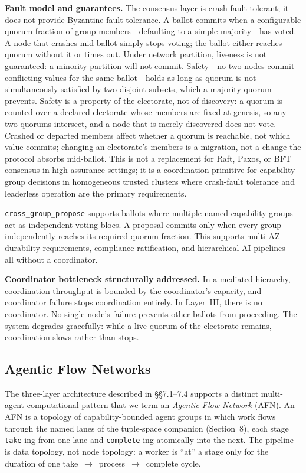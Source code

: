 \documentclass[11pt]{article}
\begin{document}
\textbf{Fault model and guarantees.} The consensus layer is crash-fault tolerant;
it does not provide Byzantine fault tolerance. A ballot commits when a configurable
quorum fraction of group members---defaulting to a simple majority---has voted. A
node that crashes mid-ballot simply stops voting; the ballot either reaches quorum
without it or times out. Under network partition, liveness is not guaranteed: a
minority partition will not commit. Safety---no two nodes commit conflicting values
for the same ballot---holds as long as quorum is not simultaneously satisfied by
two disjoint subsets, which a majority quorum prevents. Safety is a property of
the electorate, not of discovery: a quorum is counted over a declared electorate whose
members are fixed at genesis, so any two quorums intersect, and a node that is merely
discovered does not vote. Crashed or departed members affect whether a quorum is
reachable, not which value commits; changing an electorate's members is a migration,
not a change the protocol absorbs mid-ballot.
This is not a replacement for Raft, Paxos, or BFT consensus in high-assurance
settings; it is a coordination primitive for capability-group decisions in
homogeneous trusted clusters where crash-fault tolerance and leaderless operation
are the primary requirements.

\texttt{cross\_group\_propose} supports ballots where multiple named capability
groups act as independent voting blocs. A proposal commits only when every group
independently reaches its required quorum fraction. This supports multi-AZ
durability requirements, compliance ratification, and hierarchical AI pipelines---all
without a coordinator.

\textbf{Coordinator bottleneck structurally addressed.} In a mediated hierarchy,
coordination throughput is bounded by the coordinator's capacity, and coordinator
failure stops coordination entirely. In Layer~III, there is no coordinator. No
single node's failure prevents other ballots from proceeding. The system degrades
gracefully: while a live quorum of the electorate remains, coordination slows rather
than stops.

\subsection{Agentic Flow Networks}

The three-layer architecture described in \S\S7.1--7.4 supports a distinct
multi-agent computational pattern that we term an \emph{Agentic Flow Network}
(AFN). An AFN is a topology of capability-bounded agent groups in which work flows
through the named lanes of the tuple-space companion (Section~8), each stage
\texttt{take}-ing from one lane and \texttt{complete}-ing atomically into the
next. The pipeline is data topology, not node topology: a worker is ``at'' a
stage only for the duration of one take~$\to$~process~$\to$~complete cycle.
\end{document}
